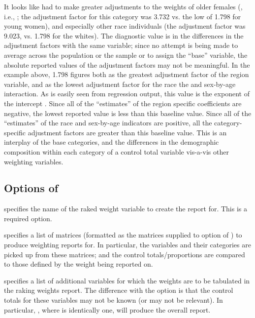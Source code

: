 It looks like  had to make greater adjustments to the weights
of older females (, i.e., ;
the adjustment factor for this category was 3.732 vs. the low of 1.798 for young women),
and especially other race individuals (the adjustment factor was 9.023,
vs. 1.798 for the whites). The diagnostic value is in the differences in the adjustment
factors with the same variable; since no attempt is being made to average
across the population or the sample or to assign the ``base'' variable,
the absolute reported values of the adjustment factors may not be
meaningful. In the example above, 1.798 figures both as the greatest adjustment
factor of the region variable, and as the lowest adjustment factor
for the race the and sex-by-age interaction. As is easily seen from regression
output, this value is the exponent of the intercept .
Since all of the ``estimates'' of the region specific coefficients are negative,
the lowest reported value is less than this baseline value. Since all of the
``estimates'' of the race and sex-by-age indicators are positive, all
the category-specific adjustment factors are greater than this baseline value.
This is an interplay of the base categories, and the differences in the
demographic composition within each category of a control total variable
vis-a-vis other weighting variables.

\subsection{Options of }

\hangpara
{} specifies the name of the raked weight variable to create
    the report for. This is a required option.

\hangpara
{} specifies a list of matrices (formatted as the matrices
    supplied to  option of ) to produce weighting reports for.
    In particular, the variables and their categories are picked up from these matrices;
    and the control totals/proportions are compared to those defined by the weight being reported on.

\hangpara
{} specifies a list of additional variables for which the weights are to
    be tabulated in the raking weights report. The difference with the  option
    is that the control totals for these variables may not be known (or may not be relevant).
    In particular, , where  is identically one, will produce
    the overall report.


